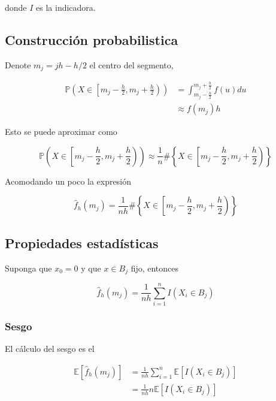 \documentclass[12pt]{book}\usepackage[]{graphicx}\usepackage[]{color}
\theoremstyle{definition}
\theoremstyle{plain}
\begin{document}
donde \(I\) es la indicadora.

\subsection{Construcción probabilistica}

Denote \(m_j=jh-h/2\) el centro del segmento,

\begin{align*}
	\mathbb{P}\left(X\in \left[m_j - \frac{h}{2},m_j + \frac{h}{2} \right)\right) & =
	\int_{m_j - \frac{h}{2}}^{m_j + \frac{h}{2}} f(u)du                                             \\
	                                                                              & \approx f(m_j)h
\end{align*}

Esto se puede aproximar como

\begin{equation*}
	\mathbb{P} \left(X\in \left[m_j - \frac{h}{2},m_j + \frac{h}{2}\right) \right)  \approx   \frac{1}{n} \#
	\left\{X\in \left[m_j - \frac{h}{2},m_j + \frac{h}{2}\right) \right\}
\end{equation*}

Acomodando un poco la expresión

\begin{equation*}
	\hat{f}_h(m_j) =  \frac{1}{nh} \#
	\left\{X\in \left[m_j - \frac{h}{2},m_j + \frac{h}{2}\right) \right\}
\end{equation*}

\subsection{Propiedades estadísticas }

Suponga que  \(x_0 = 0\) y que \(x \in B_j\) fijo, entonces

\begin{equation*}
	\hat{f}_h(m_j) =  \frac{1}{nh} \sum_{i = 1}^{n} I(X_i \in B_j)
\end{equation*}

\subsubsection{Sesgo}

El cálculo del sesgo es el

\begin{align*}
	\mathbb{E}\left[ \hat{f}_h(m_j)\right]
	  & =  \frac{1}{nh} \sum_{i = 1}^{n} \mathbb{E}\left[ I(X_i \in B_j)\right] \\
	  & = \frac{1}{nh} n \mathbb{E}\left[ I(X_i \in B_j)\right]
\end{align*}
\end{document}
